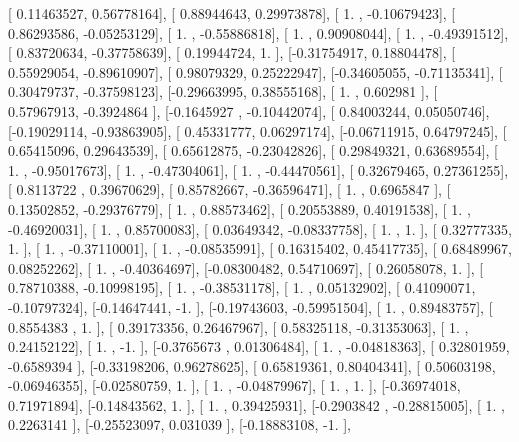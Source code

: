 \documentclass{article}
\begin{document}
       [ 0.11463527,  0.56778164],
       [ 0.88944643,  0.29973878],
       [ 1.        , -0.10679423],
       [ 0.86293586, -0.05253129],
       [ 1.        , -0.55886818],
       [ 1.        ,  0.90908044],
       [ 1.        , -0.49391512],
       [ 0.83720634, -0.37758639],
       [ 0.19944724,  1.        ],
       [-0.31754917,  0.18804478],
       [ 0.55929054, -0.89610907],
       [ 0.98079329,  0.25222947],
       [-0.34605055, -0.71135341],
       [ 0.30479737, -0.37598123],
       [-0.29663995,  0.38555168],
       [ 1.        ,  0.602981  ],
       [ 0.57967913, -0.3924864 ],
       [-0.1645927 , -0.10442074],
       [ 0.84003244,  0.05050746],
       [-0.19029114, -0.93863905],
       [ 0.45331777,  0.06297174],
       [-0.06711915,  0.64797245],
       [ 0.65415096,  0.29643539],
       [ 0.65612875, -0.23042826],
       [ 0.29849321,  0.63689554],
       [ 1.        , -0.95017673],
       [ 1.        , -0.47304061],
       [ 1.        , -0.44470561],
       [ 0.32679465,  0.27361255],
       [ 0.8113722 ,  0.39670629],
       [ 0.85782667, -0.36596471],
       [ 1.        ,  0.6965847 ],
       [ 0.13502852, -0.29376779],
       [ 1.        ,  0.88573462],
       [ 0.20553889,  0.40191538],
       [ 1.        , -0.46920031],
       [ 1.        ,  0.85700083],
       [ 0.03649342, -0.08337758],
       [ 1.        ,  1.        ],
       [ 0.32777335,  1.        ],
       [ 1.        , -0.37110001],
       [ 1.        , -0.08535991],
       [ 0.16315402,  0.45417735],
       [ 0.68489967,  0.08252262],
       [ 1.        , -0.40364697],
       [-0.08300482,  0.54710697],
       [ 0.26058078,  1.        ],
       [ 0.78710388, -0.10998195],
       [ 1.        , -0.38531178],
       [ 1.        ,  0.05132902],
       [ 0.41090071, -0.10797324],
       [-0.14647441, -1.        ],
       [-0.19743603, -0.59951504],
       [ 1.        ,  0.89483757],
       [ 0.8554383 ,  1.        ],
       [ 0.39173356,  0.26467967],
       [ 0.58325118, -0.31353063],
       [ 1.        ,  0.24152122],
       [ 1.        , -1.        ],
       [-0.3765673 ,  0.01306484],
       [ 1.        , -0.04818363],
       [ 0.32801959, -0.6589394 ],
       [-0.33198206,  0.96278625],
       [ 0.65819361,  0.80404341],
       [ 0.50603198, -0.06946355],
       [-0.02580759,  1.        ],
       [ 1.        , -0.04879967],
       [ 1.        ,  1.        ],
       [-0.36974018,  0.71971894],
       [-0.14843562,  1.        ],
       [ 1.        ,  0.39425931],
       [-0.2903842 , -0.28815005],
       [ 1.        ,  0.2263141 ],
       [-0.25523097,  0.031039  ],
       [-0.18883108, -1.        ],
\end{document}
